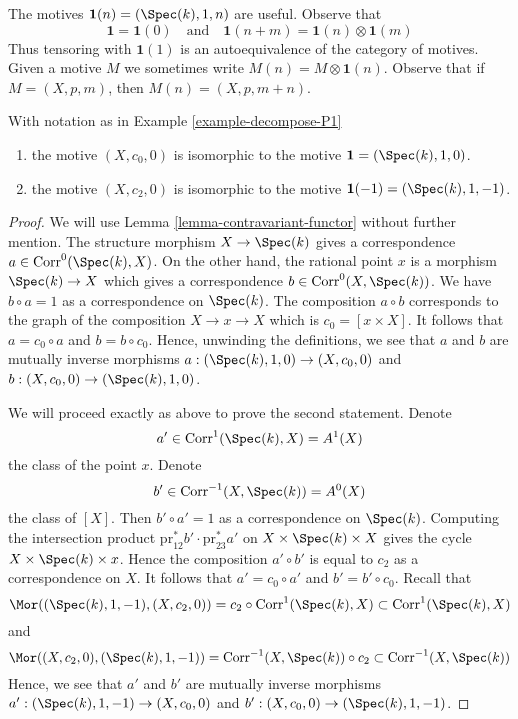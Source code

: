 \noindent
The motives $\mathbf{1}(n) = (\Spec(k), 1, n)$ are useful. Observe that
$$
\mathbf{1} = \mathbf{1}(0)
\quad\text{and}\quad
\mathbf{1}(n + m) = \mathbf{1}(n) \otimes \mathbf{1}(m)
$$
Thus tensoring with $\mathbf{1}(1)$ is an autoequivalence of the
category of motives. Given a motive $M$ we sometimes write
$M(n) = M \otimes \mathbf{1}(n)$. Observe that if $M = (X, p, m)$,
then $M(n) = (X, p, m + n)$.

\begin{lemma}
\label{lemma-inverse-h2}
With notation as in Example \ref{example-decompose-P1}
\begin{enumerate}
\item
the motive $(X, c_0, 0)$ is isomorphic to the motive
$\mathbf{1} = (\Spec(k), 1, 0)$.
\item
the motive $(X, c_2, 0)$ is isomorphic to the motive
$\mathbf{1}(-1) = (\Spec(k), 1, -1)$.
\end{enumerate}
\end{lemma}

\begin{proof}
We will use Lemma \ref{lemma-contravariant-functor} without further mention.
The structure morphism $X \to \Spec(k)$ gives a correspondence
$a \in \text{Corr}^0(\Spec(k), X)$. On the other hand, the rational
point $x$ is a morphism $\Spec(k) \to X$ which gives a correspondence
$b \in \text{Corr}^0(X, \Spec(k))$. We have $b \circ a = 1$ as a
correspondence on $\Spec(k)$. The composition $a \circ b$ corresponds
to the graph of the composition $X \to x \to X$ which is
$c_0 = [x \times X]$. It follows that $a = c_0 \circ a$ and
$b = b \circ c_0$. Hence, unwinding the definitions, we see that
$a$ and $b$ are mutually inverse morphisms
$a : (\Spec(k), 1, 0) \to (X, c_0, 0)$ and
$b : (X, c_0, 0) \to (\Spec(k), 1, 0)$.

\medskip\noindent
We will proceed exactly as above to prove the second statement.
Denote
$$
a' \in \text{Corr}^1(\Spec(k), X) = A^1(X)
$$
the class of the point $x$. Denote
$$
b' \in \text{Corr}^{-1}(X, \Spec(k)) = A^0(X)
$$
the class of $[X]$. Then $b' \circ a' = 1$ as a correspondence on $\Spec(k)$.
Computing the intersection product
$\text{pr}_{12}^*b' \cdot \text{pr}_{23}^*a'$
on $X \times \Spec(k) \times X$ gives the cycle
$X \times \Spec(k) \times x$. Hence
the composition $a' \circ b'$ is equal to $c_2$ as a
correspondence on $X$. It follows that $a' = c_0 \circ a'$ and
$b' = b' \circ c_0$. Recall that
$$
\Mor((\Spec(k), 1, -1), (X, c_2, 0)) =
c_2 \circ \text{Corr}^1(\Spec(k), X)
\subset
\text{Corr}^1(\Spec(k), X)
$$
and
$$
\Mor((X, c_2, 0), (\Spec(k), 1, -1)) =
\text{Corr}^{-1}(X, \Spec(k)) \circ c_2
\subset
\text{Corr}^{-1}(X, \Spec(k))
$$
Hence, we see that $a'$ and $b'$ are mutually inverse morphisms
$a' : (\Spec(k), 1, -1) \to (X, c_0, 0)$ and
$b' : (X, c_0, 0) \to (\Spec(k), 1, -1)$.
\end{proof}

